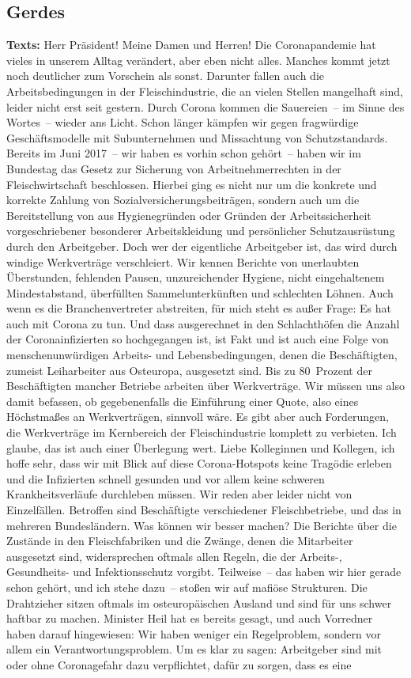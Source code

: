 \documentclass{article}
\begin{document}
\subsection{Gerdes}
\noindent\textbf{Texts:} Herr Präsident! Meine Damen und Herren! Die Coronapandemie hat vieles in unserem Alltag verändert, aber eben nicht alles. Manches kommt jetzt noch deutlicher zum Vorschein als sonst. Darunter fallen auch die Arbeitsbedingungen in der Fleischindustrie, die an vielen Stellen mangelhaft sind, leider nicht erst seit gestern. Durch Corona kommen die Sauereien – im Sinne des Wortes – wieder ans Licht. Schon länger kämpfen wir gegen fragwürdige Geschäftsmodelle mit Subunternehmen und Missachtung von Schutzstandards. Bereits im Juni 2017 – wir haben es vorhin schon gehört – haben wir im Bundestag das Gesetz zur Sicherung von Arbeitnehmerrechten in der Fleischwirtschaft beschlossen. Hierbei ging es nicht nur um die konkrete und korrekte Zahlung von Sozialversicherungsbeiträgen, sondern auch um die Bereitstellung von aus Hygienegründen oder Gründen der Arbeitssicherheit vorgeschriebener besonderer Arbeitskleidung und persönlicher Schutzausrüstung durch den Arbeitgeber. Doch wer der eigentliche Arbeitgeber ist, das wird durch windige Werkverträge verschleiert. Wir kennen Berichte von unerlaubten Überstunden, fehlenden Pausen, unzureichender Hygiene, nicht eingehaltenem Mindestabstand, überfüllten Sammelunterkünften und schlechten Löhnen. Auch wenn es die Branchenvertreter abstreiten, für mich steht es außer Frage: Es hat auch mit Corona zu tun. Und dass ausgerechnet in den Schlachthöfen die Anzahl der Coronainfizierten so hochgegangen ist, ist Fakt und ist auch eine Folge von menschenunwürdigen Arbeits- und Lebensbedingungen, denen die Beschäftigten, zumeist Leiharbeiter aus Osteuropa, ausgesetzt sind. Bis zu 80 Prozent der Beschäftigten mancher Betriebe arbeiten über Werkverträge. Wir müssen uns also damit befassen, ob gegebenenfalls die Einführung einer Quote, also eines Höchstmaßes an Werkverträgen, sinnvoll wäre. Es gibt aber auch Forderungen, die Werkverträge im Kernbereich der Fleischindustrie komplett zu verbieten. Ich glaube, das ist auch einer Überlegung wert.  Liebe Kolleginnen und Kollegen, ich hoffe sehr, dass wir mit Blick auf diese Corona-Hotspots keine Tragödie erleben und die Infizierten schnell gesunden und vor allem keine schweren Krankheitsverläufe durchleben müssen. Wir reden aber leider nicht von Einzelfällen. Betroffen sind Beschäftigte verschiedener Fleischbetriebe, und das in mehreren Bundesländern. Was können wir besser machen? Die Berichte über die Zustände in den Fleischfabriken und die Zwänge, denen die Mitarbeiter ausgesetzt sind, widersprechen oftmals allen Regeln, die der Arbeits-, Gesundheits- und Infektionsschutz vorgibt. Teilweise – das haben wir hier gerade schon gehört, und ich stehe dazu – stoßen wir auf mafiöse Strukturen. Die Drahtzieher sitzen oftmals im osteuropäischen Ausland und sind für uns schwer haftbar zu machen.  Minister Heil hat es bereits gesagt, und auch Vorredner haben darauf hingewiesen: Wir haben weniger ein Regelproblem, sondern vor allem ein Verantwortungsproblem. Um es klar zu sagen: Arbeitgeber sind mit oder ohne Coronagefahr dazu verpflichtet, dafür zu sorgen, dass es eine 
\end{document}
